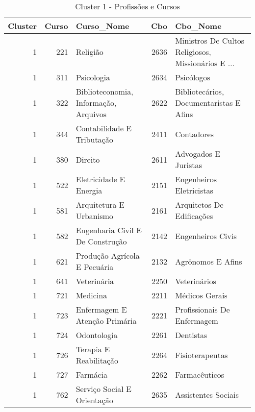 \begin{table}
\centering
\caption{Cluster 1 - Profissões e Cursos }
\label{tab:Profissoes_Cluster1}
\begin{tabular}{rrlrl}
\toprule
 Cluster &  Curso &                            Curso\_Nome &  Cbo &                                           Cbo\_Nome \\
\midrule
       1 &    221 &                              Religião & 2636 & Ministros De Cultos Religiosos, Missionários E ... \\
       1 &    311 &                            Psicologia & 2634 &                                         Psicólogos \\
       1 &    322 & Biblioteconomia, Informação, Arquivos & 2622 &            Bibliotecários, Documentaristas E Afins \\
       1 &    344 &            Contabilidade E Tributação & 2411 &                                         Contadores \\
       1 &    380 &                               Direito & 2611 &                               Advogados E Juristas \\
       1 &    522 &                Eletricidade E Energia & 2151 &                           Engenheiros Eletricistas \\
       1 &    581 &               Arquitetura E Urbanismo & 2161 &                          Arquitetos De Edificações \\
       1 &    582 &      Engenharia Civil E De Construção & 2142 &                                 Engenheiros Civis  \\
       1 &    621 &          Produção Agrícola E Pecuária & 2132 &                                  Agrônomos E Afins \\
       1 &    641 &                           Veterinária & 2250 &                                       Veterinários \\
       1 &    721 &                              Medicina & 2211 &                                     Médicos Gerais \\
       1 &    723 &         Enfermagem E Atenção Primária & 2221 &                       Profissionais De Enfermagem  \\
       1 &    724 &                           Odontologia & 2261 &                                          Dentistas \\
       1 &    726 &                Terapia E Reabilitação & 2264 &                                    Fisioterapeutas \\
       1 &    727 &                              Farmácia & 2262 &                                      Farmacêuticos \\
       1 &    762 &           Serviço Social E Orientação & 2635 &                                Assistentes Sociais \\
\bottomrule
\end{tabular}
\end{table}
